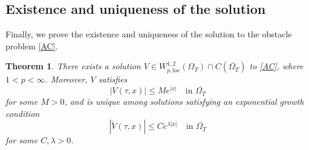 \documentclass[11pt, a4paper, leqno]{amsart}
\numberwithin{equation}{section}
\theoremstyle{plain}
\newtheorem{theorem}{Theorem}[section]
\theoremstyle{definition}
\theoremstyle{remark}
\def\leq{\leqslant}
\begin{document}
\subsection{{Existence and uniqueness of the solution}}
Finally, we prove the existence and uniqueness of the solution to the obstacle
problem \eqref{AC}.
\begin{theorem}\label{thm:strong-solution}
    There exists {a solution} $V\in 
    W^{1,2}_{p, \mathrm{loc}}(\Omega_T)\cap C(\overline{\Omega_T})$
    to \eqref{AC}, where $1<p<\infty$. 
    {
    Moreover, $V$ satisfies
    \[
        |V(\tau,x)|\leq M e^{|x|}
        \quad\text{in }\overline{\Omega_T}
    \]
    for some $M>0$, and is unique among solutions satisfying an
    exponential growth condition
    \[
        |\widetilde V(\tau,x)|
        \leq C e^{\lambda|x|}
        \quad\text{in }\overline{\Omega_T}
    \]
    for some $C,\lambda>0$.
    }
\end{theorem}
\end{document}
